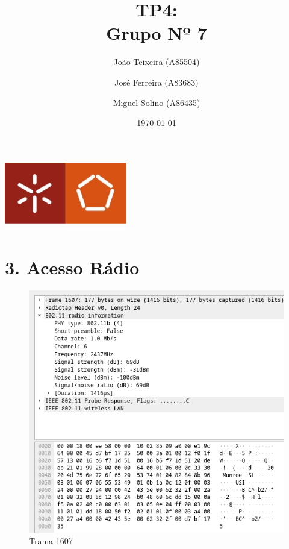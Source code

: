 \documentclass[a4paper]{report}
\begin{document}
\title{TP4:\\ 
    \large Grupo Nº 7}
\author{João Teixeira (A85504) \and José Ferreira (A83683) \and Miguel Solino (A86435)}

\date{\today}

\begin{center}
    \begin{minipage}{0.75\linewidth}
        \centering
        \includegraphics[width=0.4\textwidth]{images/eng.jpeg}\par\vspace{1cm}
        \vspace{1cm}
        \href{https://www.uminho.pt/PT}
        {\color{black}{\scshape\LARGE Universidade do Minho}} \par
        \vspace{1cm}
        \href{https://www.di.uminho.pt/}
        {\color{black}{\scshape\Large Departamento de Informática}} \par
        \maketitle
    \end{minipage}
\end{center}

\tableofcontents
\chapter{3. Acesso Rádio}

\begin{figure}[H]
    \centering 
    \includegraphics[width=\textwidth]{images/trama1607.png}  
    \caption{Trama 1607}
    \label{fig:trama1607}
\end{figure}
\end{document}
